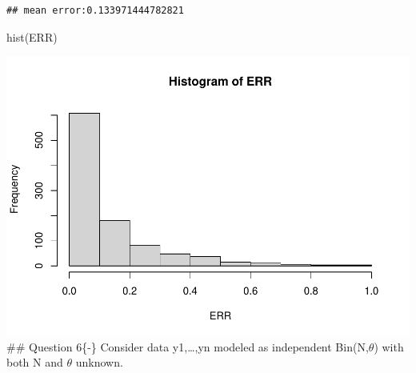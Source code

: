 \documentclass[
]{book}
\newenvironment{Shaded}{\begin{snugshade}}{\end{snugshade}}
\newcommand{\FunctionTok}[1]{\textcolor[rgb]{0.00,0.00,0.00}{#1}}
\newcommand{\NormalTok}[1]{#1}
\theoremstyle{definition}
\theoremstyle{definition}
\theoremstyle{definition}
\theoremstyle{definition}
\theoremstyle{remark}
\begin{document}
\begin{verbatim}
## mean error:0.133971444782821
\end{verbatim}

\begin{Shaded}
\begin{Highlighting}[]
 \FunctionTok{hist}\NormalTok{(ERR)}
\end{Highlighting}
\end{Shaded}

\includegraphics{_main_files/figure-latex/unnamed-chunk-42-1.pdf}
\#\# Question 6\{-\}
Consider data y1,\ldots,yn modeled as independent Bin(N,\(\theta\)) with both N and \(\theta\) unknown.
\end{document}
